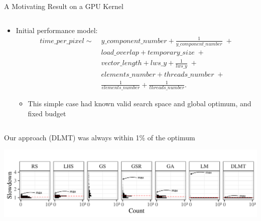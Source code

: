 \documentclass[11pt, compress, aspectratio=169, xcolor={table,usenames,dvipsnames}]{beamer}
\begin{document}
\begin{frame}
\begin{columns}
\begin{column}{0.89\columnwidth}
\begin{columns}
\begin{column}[t]{0.48\columnwidth}
\begin{block}{A Motivating Result on a GPU Kernel}
\begin{columns}
\begin{column}{0.49\columnwidth}
\begin{itemize}
\item Initial \alert{performance model}:
{\tiny
  \begin{align}
    time\_per\_pixel \sim & \; y\_component\_number + \frac{1}{y\_component\_number} \; + \nonumber \\
    & \; load\_overlap + temporary\_size \; + \nonumber \\
    & \; vector\_length + lws\_y + \frac{1}{lws\_y} \; + \nonumber \\
    & \; elements\_number + threads\_number  \; + \nonumber \\
    & \; \frac{1}{elements\_number} + \frac{1}{threads\_number}\text{.} \nonumber
  \end{align}
}

\begin{itemize}
\item This \alert{simple case} had known \alert{valid search space} and
\alert{global optimum}, and \alert{fixed budget}
\end{itemize}
\end{itemize}
\end{column}
\end{columns}
\vspace{1em}
\begin{center}
{\small
Our approach (\alert{DLMT}) was always \alert{within 1\% of the optimum}
}
\end{center}
\begin{center}
\includegraphics[width=0.9\columnwidth]{../../../img/comparison_histogram.pdf}
\end{center}


\end{block}
\end{column}
\end{columns}
\end{column}
\end{columns}
\end{frame}
\end{document}
